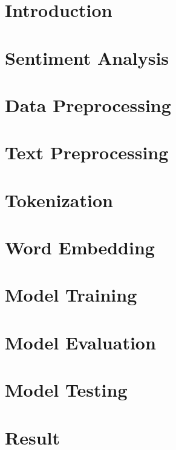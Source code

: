 \documentclass[12pt]{report}
\begin{document}









\tableofcontents





\chapter{ Introduction} \label{ch:intro}

\chapter{ Sentiment Analysis} \label{ch:background}


\chapter{ Data Preprocessing} \label{ch:background}


\chapter{Text Preprocessing} \label{ch:literature_review}



\chapter{Tokenization} \label{ch:main_chapter1}


\chapter{Word Embedding} \label{ch:main_chapter2}


\chapter{Model Training} \label{ch:proposal}


\chapter{Model Evaluation} \label{ch:experimental_results}


\chapter{Model Testing} \label{ch:conclusion}

\chapter{Result} \label{ch:main_chapter1}


\printbibliography
\end{document}
